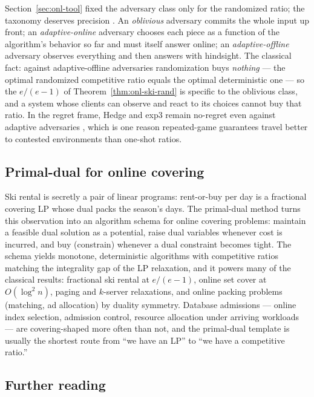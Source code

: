 Section~\ref{sec:onl-tool} fixed the adversary class only for the randomized
ratio; the taxonomy deserves precision \citep{online-decisions-bg14}. An
\emph{oblivious} adversary commits the whole input up front; an
\emph{adaptive-online} adversary chooses each piece as a function of the
algorithm's behavior so far and must itself answer online; an
\emph{adaptive-offline} adversary observes everything and then answers with
hindsight. The classical fact: against adaptive-offline adversaries
randomization buys \emph{nothing} --- the optimal randomized competitive ratio
equals the optimal deterministic one --- so the $e/(e-1)$ of
Theorem~\ref{thm:onl-ski-rand} is specific to the oblivious class, and a
system whose clients can observe and react to its choices cannot buy that
ratio. In the regret frame, Hedge and exp3 remain no-regret even against
adaptive adversaries \citep{online-decisions-bg4,online-decisions-bg8}, which
is one reason repeated-game guarantees travel better to contested
environments than one-shot ratios.

\subsection{Primal-dual for online covering}
\label{sec:onl-primaldual}

Ski rental is secretly a pair of linear programs: rent-or-buy per day is a
fractional covering LP whose dual packs the season's days. The primal-dual
method \citep{online-decisions-bg10} turns this observation into an algorithm
schema for online covering problems: maintain a feasible dual solution as a
potential, raise dual variables whenever cost is incurred, and buy
(constrain) whenever a dual constraint becomes tight. The schema yields
monotone, deterministic algorithms with competitive ratios matching the
integrality gap of the LP relaxation, and it powers many of the classical
results: fractional ski rental at $e/(e-1)$, online set cover at
$O(\log^2 n)$, paging and $k$-server relaxations, and online packing problems
(matching, ad allocation) by duality symmetry. Database admissions ---
online index selection, admission control, resource allocation under arriving
workloads --- are covering-shaped more often than not, and the primal-dual
template is usually the shortest route from ``we have an LP'' to ``we have a
competitive ratio.''

\subsection{Further reading}

